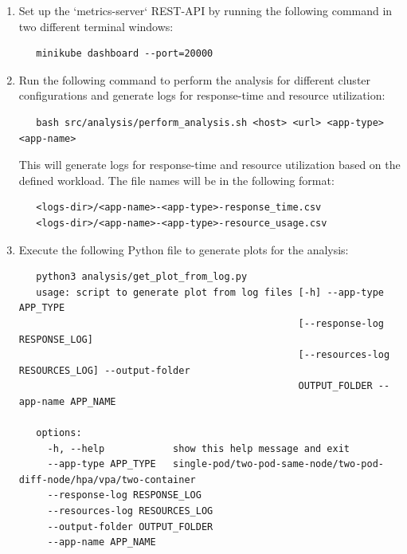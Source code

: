 \documentclass{article}
\begin{document}
\begin{enumerate}
   \item Set up the `metrics-server` REST-API by running the following command in two different terminal windows:
   
   \begin{verbatim}
   minikube dashboard --port=20000
   \end{verbatim}
   
   \item Run the following command to perform the analysis for different cluster configurations and generate logs for response-time and resource utilization:
   
   \begin{verbatim}
   bash src/analysis/perform_analysis.sh <host> <url> <app-type> <app-name>
   \end{verbatim}
   
   This will generate logs for response-time and resource utilization based on the defined workload. The file names will be in the following format:
   
   \begin{verbatim}
   <logs-dir>/<app-name>-<app-type>-response_time.csv
   <logs-dir>/<app-name>-<app-type>-resource_usage.csv
   \end{verbatim}
   
   \item Execute the following Python file to generate plots for the analysis:
   
   \begin{verbatim}
   python3 analysis/get_plot_from_log.py
   usage: script to generate plot from log files [-h] --app-type APP_TYPE
                                                 [--response-log RESPONSE_LOG]
                                                 [--resources-log RESOURCES_LOG] --output-folder
                                                 OUTPUT_FOLDER --app-name APP_NAME

   options:
     -h, --help            show this help message and exit
     --app-type APP_TYPE   single-pod/two-pod-same-node/two-pod-diff-node/hpa/vpa/two-container
     --response-log RESPONSE_LOG
     --resources-log RESOURCES_LOG
     --output-folder OUTPUT_FOLDER
     --app-name APP_NAME
   \end{verbatim}
\end{enumerate}
\end{document}

